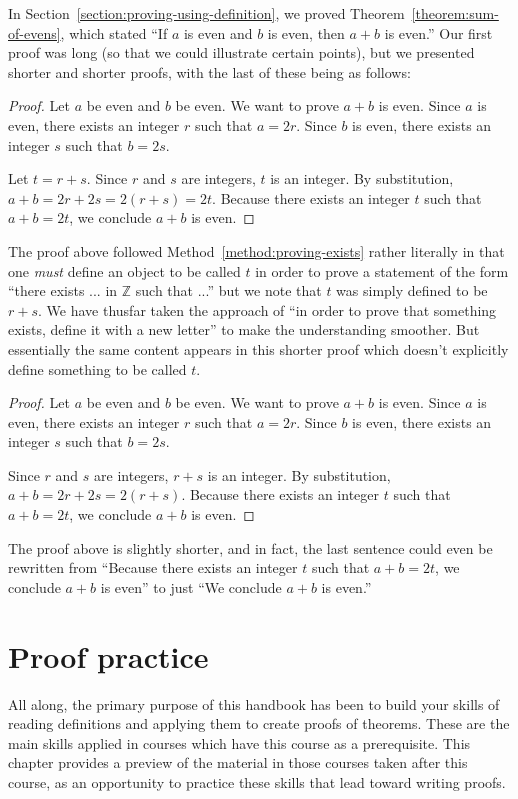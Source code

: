 \documentclass{book}
\theoremstyle{ekimcustom}
\begin{document}
In Section~\ref{section:proving-using-definition}, we proved Theorem~\ref{theorem:sum-of-evens}, which stated ``If $a$ is even and $b$ is even, then $a+b$ is even.'' Our first proof was long (so that we could illustrate certain points), but we presented shorter and shorter proofs, with the last of these being as follows:
\begin{proof}
Let $a$ be even and $b$ be even. We want to prove $a+b$ is even. Since $a$ is even, there exists an integer $r$ such that $a=2r$. Since $b$ is even, there exists an integer $s$ such that $b=2s$.

Let $t=r+s$. Since $r$ and $s$ are integers, $t$ is an integer. By substitution, $a+b=2r+2s=2(r+s)=2t$. Because there exists an integer $t$ such that $a+b=2t$, we conclude $a+b$ is even.
\end{proof}
The proof above followed Method~\ref{method:proving-exists} rather literally in that one \emph{must} define an object to be called $t$ in order to prove a statement of the form ``there exists ... in $\mathbb{Z}$ such that ...'' but we note that $t$ was simply defined to be $r+s$. We have thusfar taken the approach of ``in order to prove that something exists, define it with a new letter'' to make the understanding smoother. But essentially the same content appears in this shorter proof which doesn't explicitly define something to be called $t$.
\begin{proof}
Let $a$ be even and $b$ be even. We want to prove $a+b$ is even. Since $a$ is even, there exists an integer $r$ such that $a=2r$. Since $b$ is even, there exists an integer $s$ such that $b=2s$.

Since $r$ and $s$ are integers, $r+s$ is an integer. By substitution, $a+b=2r+2s=2(r+s)$. Because there exists an integer $t$ such that $a+b=2t$, we conclude $a+b$ is even.
\end{proof}
The proof above is slightly shorter, and in fact, the last sentence could even be rewritten from ``Because there exists an integer $t$ such that $a+b=2t$, we conclude $a+b$ is even'' to just ``We conclude $a+b$ is even.''

\chapter{Proof practice}

All along, the primary purpose of this handbook has been to build your skills of reading definitions and applying them to create proofs of theorems. These are the main skills applied in courses which have this course as a prerequisite. This chapter provides a preview of the material in those courses taken after this course, as an opportunity to practice these skills that lead toward writing proofs.
\end{document}
